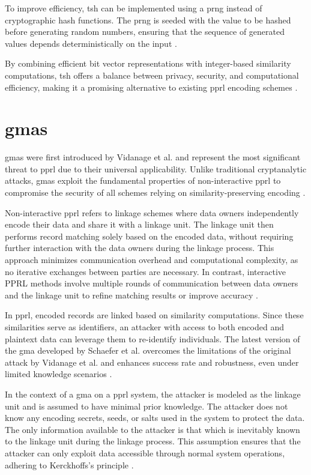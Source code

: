 To improve efficiency, \ac{tsh} can be implemented using a \ac{prng} instead of cryptographic hash functions.
The \ac{prng} is seeded with the value to be hashed before generating random numbers, ensuring that the sequence of generated values depends deterministically on the input \cite{schaefer2024}.

By combining efficient bit vector representations with integer-based similarity computations, \ac{tsh} offers a balance between privacy, security, and computational efficiency, making it a promising alternative to existing \ac{pprl} encoding schemes \cite{vidanage2020graph, schaefer2024}.

\section{\ac{gma}s} \label{sec:gma}

\ac{gma}s  were first introduced by Vidanage et al. \cite{vidanage2020graph} and represent the most significant threat to \ac{pprl} due to their universal applicability.
Unlike traditional cryptanalytic attacks, \ac{gma}s exploit the fundamental properties of non-interactive \ac{pprl} to compromise the security of all schemes relying on similarity-preserving encoding \cite{schaefer2024}.


Non-interactive \ac{pprl} refers to linkage schemes where data owners independently encode their data and share it with a linkage unit.
The linkage unit then performs record matching solely based on the encoded data, without requiring further interaction with the data owners during the linkage process.
This approach minimizes communication overhead and computational complexity, as no iterative exchanges between parties are necessary.
In contrast, interactive PPRL methods involve multiple rounds of communication between data owners and the linkage unit to refine matching results or improve accuracy \cite{kum2014privacy}.

In \ac{pprl}, encoded records are linked based on similarity computations.
Since these similarities serve as identifiers, an attacker with access to both encoded and plaintext data can leverage them to re-identify individuals.
The latest version of the \ac{gma} developed by Schaefer et al. \cite{schaefer2024} overcomes the limitations of the original attack by Vidanage et al. \cite{vidanage2020graph} and enhances success rate and robustness, even under limited knowledge scenarios \cite{schaefer2024}.

In the context of a \ac{gma} on a \ac{pprl} system, the attacker is modeled as the linkage unit and is assumed to have minimal prior knowledge.
The attacker does not know any encoding secrets, seeds, or salts used in the system to protect the data.
The only information available to the attacker is that which is inevitably known to the linkage unit during the linkage process.
This assumption ensures that the attacker can only exploit data accessible through normal system operations, adhering to Kerckhoffs's principle \cite{schaefer2024}.

